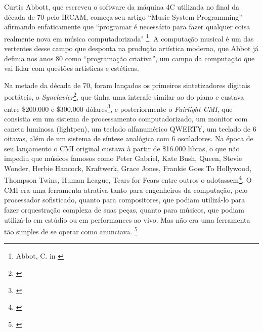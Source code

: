 {Curtis Abbott, que escreveu o software da máquina 4C utilizada no final da década de 70 pelo IRCAM, começa seu artigo ``Music System Programming'' afirmando enfaticamente que ``programar é necessário para fazer qualquer coisa realmente nova em música computadorizada" \footnote{Abbot, C. in \cite[51]{Roads1996}}. A computação musical é um das vertentes desse campo que desponta na produção artística moderna, que Abbot já definia nos anos 80 como ``programação criativa'', um campo da computação que vai lidar com questões artísticas e estéticas. 

Na metade da década de 70, foram lançados os primeiros sintetizadores digitais portáteis, o \emph{Synclavier}\footnote{\cite[265]{Holmes1985}}, que tinha uma interafe similar ao do piano e custava entre \$200.000 e \$300.000 dólares\footnote{\cite{JosephParadiso1998}}, e posteriormente o \emph{Fairlight CMI}, que consistia em um sistema de processamento computadorizado, um monitor com caneta luminosa (lightpen), um teclado alfanumérico QWERTY, um teclado de 6 oitavas, além de um sistema de síntese analógica com 6 osciladores. Na época de seu lançamento o CMI original custava à partir de \$16.000 libras, o que não impediu que músicos famosos como Peter Gabriel, Kate Bush, Queen, Stevie Wonder, Herbie Hancock, Kraftwerk, Grace Jones, Frankie Goes To Hollywood, Thompson Twins, Human League, Tears for Fears entre outros o adotassem\footnote{\cite[18]{Twyman2004}}. O CMI era uma ferramenta atrativa tanto para engenheiros da computação, pelo processador sofisticado, quanto para compositores, que podiam utilizá-lo para fazer orquestração complexa de suas peças, quanto para músicos, que podiam utilizá-lo em estúdio ou em performances ao vivo. Mas não era uma ferramenta tão simples de se operar como anunciava. \footnote{\cite[55]{Twyman2004}}

}
